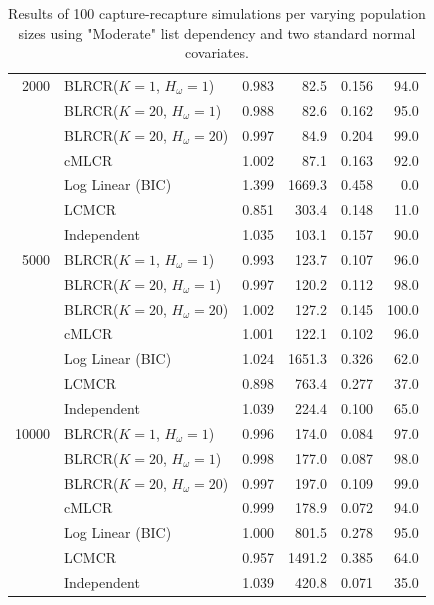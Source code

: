 \documentclass[
  12pt,
]{article}
\begin{document}
\begin{table}[H]
\begin{tabular}{||r l r r r r||}
\hline
2000    & BLRCR($K=1$, $H_\omega=1$)  & 0.983   & 82.5   & 0.156   & 94.0 \\ 
               & BLRCR($K=20$, $H_\omega=1$)   & 0.988     & 82.6     & 0.162     & 95.0 \\ 
               & BLRCR($K=20$, $H_\omega=20$)    & 0.997     & 84.9     & 0.204     & 99.0 \\  
               & cMLCR       & 1.002       & 87.1      & 0.163      & 92.0 \\
               & Log Linear (BIC)  & 1.399      & 1669.3     & 0.458     & 0.0 \\ 
               & LCMCR       & 0.851       & 303.4      & 0.148      & 11.0 \\ 
               & Independent & 1.035 & 103.1& 0.157& 90.0 \\ 


\hline
5000    & BLRCR($K=1$, $H_\omega=1$)  & 0.993   & 123.7   & 0.107   & 96.0 \\ 
               & BLRCR($K=20$, $H_\omega=1$)    & 0.997     & 120.2     & 0.112     & 98.0 \\ 
               & BLRCR($K=20$, $H_\omega=20$)    & 1.002     & 127.2     & 0.145     & 100.0 \\  
               & cMLCR       & 1.001       & 122.1      & 0.102      & 96.0 \\
               & Log Linear (BIC)  & 1.024      & 1651.3     & 0.326     & 62.0 \\ 
               & LCMCR       & 0.898       & 763.4      & 0.277      & 37.0 \\ 
               & Independent & 1.039 & 224.4& 0.100& 65.0 \\ 


\hline
10000    & BLRCR($K=1$, $H_\omega=1$)  & 0.996   & 174.0   & 0.084   & 97.0 \\ 
               & BLRCR($K=20$, $H_\omega=1$)    & 0.998     & 177.0     & 0.087     & 98.0 \\ 
               & BLRCR($K=20$, $H_\omega=20$)    & 0.997     & 197.0     & 0.109     & 99.0 \\  
               & cMLCR       & 0.999       & 178.9      & 0.072      & 94.0 \\
               & Log Linear (BIC)  & 1.000      & 801.5     & 0.278     & 95.0 \\ 
               & LCMCR       & 0.957       & 1491.2      & 0.385      & 64.0 \\ 
               & Independent & 1.039 & 420.8& 0.071& 35.0 \\ 
\hline
\end{tabular}
\caption{Results of 100 capture-recapture simulations per varying population sizes using "Moderate" list dependency and two standard normal covariates. }
\label{table:diffsizes}
\end{table}
\doublespacing
\end{document}
